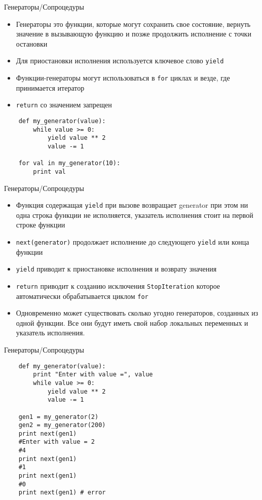 \documentclass{article}
\begin{document}
{\center Генераторы/Сопроцедуры}
\begin{itemize}
    \item Генераторы это функции, которые могут сохранить свое состояние, вернуть 
        значение в вызывающую функцию и позже продолжить исполнение с точки остановки
    \item Для приостановки исполнения используется ключевое слово \lstinline!yield!
    \item Функции-генераторы могут использоваться в \LARGE\lstinline!for! циклах и везде, где
        принимается итератор
    \item \lstinline!return! со значением запрещен
\end{itemize}
\vspace{15pt}
\begin{lstlisting}
    def my_generator(value):
        while value >= 0:
            yield value ** 2
            value -= 1

    for val in my_generator(10):
        print val
\end{lstlisting}
\newpage

{\center Генераторы/Сопроцедуры}
\begin{itemize}
    \item Функция содержащая \lstinline!yield! при вызове возвращает generator
        при этом ни одна строка функции не исполняется, указатель исполнения стоит 
        на первой строке функции
    \item \lstinline!next(generator)! продолжает исполнение до следующего 
        \lstinline!yield! или конца функции
    \item \lstinline!yield! приводит к приостановке исполнения и возврату значения
    \item \lstinline!return! приводит к созданию исключения \lstinline!StopIteration!
        которое автоматически обрабатывается циклом \lstinline!for!
    \item Одновременно может существовать сколько угодно генераторов, созданных из одной функции.
        Все они будут иметь свой набор локальных переменных и указатель исполнения.
\end{itemize}
\newpage

{\center Генераторы/Сопроцедуры}
\vspace{15pt}
\begin{lstlisting}
    def my_generator(value):
        print "Enter with value =", value
        while value >= 0:
            yield value ** 2
            value -= 1

    gen1 = my_generator(2)
    gen2 = my_generator(200)
    print next(gen1) 
    #Enter with value = 2
    #4
    print next(gen1)
    #1
    print next(gen1)
    #0
    print next(gen1) # error
\end{lstlisting}
\newpage
\end{document}
